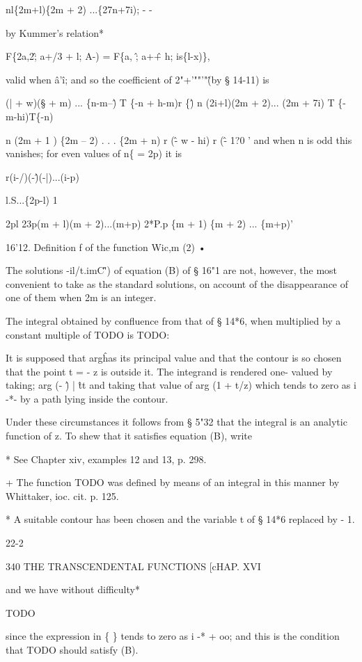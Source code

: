 nl\{2m+l)\{2m + 2) ...\{27n+7i); - -

by Kummer's relation*

F\{2a,2\^; a+/3 + l; A-) = F\{a, \^; a+\^ + h; is\{l-x)\},

valid when \^a'\^ i; and so the coefficient of 2"+'""'"\^ (by §
14-11) is

(| + w)(§ + m) ... \{n-m--\^ ) T \{-n + h-m)r \{\^ ) n (2i+l)(2m +
2)... (2m + 7i) T \{-m-hi)T\{-n)

n (2m + 1 ) \{2m -- 2) . . . \{2m + n) r (\^ - w - hi) r (\^ - 1?0 '
and when n is odd this vanishes; for even values of n\{ = 2p) it is

r(i-/)(-\^)(-|)...(i-p)

l.S...\{2p-l) 1

2pl 23p(m + l)(m + 2)...(m+p) 2*P.p \{m + 1) \{m + 2) ... \{m+p)'

16'12. Definition f of the function Wic,m (2) •

The solutions -il/t.imC\^') of equation (B) of § 16"1 are not,
however, the most convenient to take as the standard solutions, on
account of the disappearance of one of them when 2m is an integer.

The integral obtained by confluence from that of § 14*6, when
multiplied by a constant multiple of TODO is TODO:

It is supposed that arg\^ has its principal value and that the contour
is so chosen that the point t = - z is outside it. The integrand is
rendered one- valued by taking; arg (- \^) | \^ tt and taking that
value of arg (1 + t/z) which tends to zero as i -*- by a path lying
inside the contour.

Under these circumstances it follows from § 5"32 that the integral is
an analytic function of z. To shew that it satisfies equation (B),
write

* See Chapter xiv, examples 12 and 13, p. 298.

+ The function TODO was defined by means of an integral in this manner
by Whittaker, ioc. cit. p. 125.

* A suitable contour has been chosen and the variable t of § 14*6
replaced by - 1.

22-2

340 THE TRANSCENDENTAL FUNCTIONS [cHAP. XVI

and we have without difficulty*

TODO

since the expression in \{ \} tends to zero as i -* + oo; and this is
the condition that TODO should satisfy (B).

